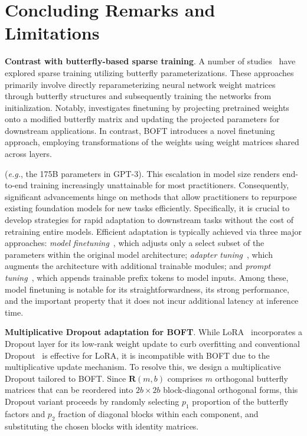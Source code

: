 \section{Concluding Remarks and Limitations}

\textbf{Contrast with butterfly-based sparse training}. A number of studies~\cite{dao2019learning,dao2019kaleidoscope,chen2022pixelated,dao2022monarch} have explored sparse training utilizing butterfly parameterizations. These approaches primarily involve directly reparameterizing neural network weight matrices through butterfly structures and subsequently training the networks from initialization. Notably, \cite{dao2022monarch} investigates finetuning by projecting pretrained weights onto a modified butterfly matrix and updating the projected parameters for downstream applications. In contrast, BOFT introduces a novel finetuning approach, employing transformations of the weights using weight matrices shared across layers.

(\emph{e.g.}, the 175B parameters in GPT-3). This escalation in model size renders end-to-end training increasingly unattainable for most practitioners. Consequently, significant advancements hinge on methods that allow practitioners to repurpose existing foundation models for new tasks efficiently. Specifically, it is crucial to develop strategies for rapid adaptation to downstream tasks without the cost of retraining entire models. Efficient adaptation is typically achieved via three major approaches: \emph{model finetuning}~\cite{hulora2022,zaken2022bitfit,guo2020parameter,raffel2020exploring,qiu2023controlling,zhang2022adaptive,chavan2023one}, which adjusts only a select subset of the parameters within the original model architecture; \emph{adapter tuning}~\cite{rebuffi2017learning,houlsby2019parameter,pfeiffer2020adapterfusion,lin2020exploring,he2021towards}, which augments the architecture with additional trainable modules; and \emph{prompt tuning}~\cite{li2021prefix,lester2021power}, which appends trainable prefix tokens to model inputs. Among these, model finetuning is notable for its straightforwardness, its strong performance, and the important property that it does not incur additional latency at inference time.

\textbf{Multiplicative Dropout adaptation for BOFT}. While LoRA~\cite{hulora2022} incorporates a Dropout layer for its low-rank weight update to curb overfitting and conventional Dropout~\cite{srivastava2014dropout} is effective for LoRA, it is incompatible with BOFT due to the multiplicative update mechanism. To resolve this, we design a multiplicative Dropout tailored to BOFT. Since $\bm{R}(m, b)$ comprises $m$ orthogonal butterfly matrices that can be reordered into $2b\times 2b$ block-diagonal orthogonal forms, this Dropout variant proceeds by randomly selecting $p_1$ proportion of the butterfly factors and $p_2$ fraction of diagonal blocks within each component, and substituting the chosen blocks with identity matrices.

